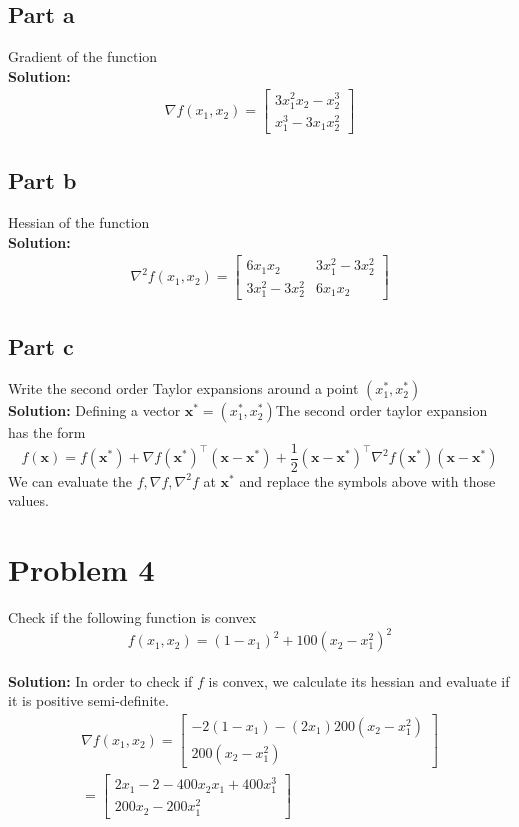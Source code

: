 \documentclass[11pt]{article}
\begin{document}
\subsection{Part a}
Gradient of the function
\\
\textbf{Solution: }
\begin{align*}
    \nabla f(x_1, x_2) = 
  \begin{bmatrix}
     3x_1^2 x_2 - x_2^3 \\
     x_1^3 - 3x_1 x_2^2
  \end{bmatrix}
\end{align*}

\subsection{Part b}
Hessian of the function
\\
\textbf{Solution: }
\begin{align*}
    \nabla^2 f(x_1, x_2) = 
  \begin{bmatrix}
     6x_1 x_2 & 3x_1^2 - 3x_2^2 \\
     3x_1^2 - 3x_2^2 &  6 x_1 x_2
  \end{bmatrix}
\end{align*}

\subsection{Part c}
Write the second order Taylor expansions around a point $(x_1^*, x_2^*)$
\\
\textbf{Solution: }
Defining a vector $\textbf{x}^* = (x_1^*, x_2^*)$The second order taylor expansion has the form
\begin{equation*}
  f(\textbf{x}) = f(\textbf{x}^*) + \nabla f(\textbf{x}^*)^\top (\textbf{x} - \textbf{x}^*) + \frac{1}{2} (\textbf{x} - \textbf{x}^*)^\top \nabla^2 f(\textbf{x}^*)(\textbf{x} - \textbf{x}^*)
\end{equation*}
We can evaluate the $f, \nabla f, \nabla^2 f$ at $\textbf{x}^*$ and replace the symbols above with those values.

\section{Problem 4}
Check if the following function is convex
\begin{equation*}
  f(x_1, x_2) = (1 - x_1)^2 + 100(x_2 - x_1^2)^2
\end{equation*}
\\
\textbf{Solution: }
In order to check if $f$ is convex, we calculate its hessian and evaluate if it is positive semi-definite.
\begin{align*}
  \nabla f(x_1, x_2) = 
  \begin{bmatrix}
    -2(1-x_1) - (2x_1) 200(x_2 - x_1^2) \\
    200(x_2 - x_1^2)
  \end{bmatrix}
  \\
  = 
  \begin{bmatrix}
    2x_1-2 - 400x_2 x_1 + 400x_1^3 \\
    200x_2 - 200x_1^2
  \end{bmatrix}
\end{align*}
\end{document}
